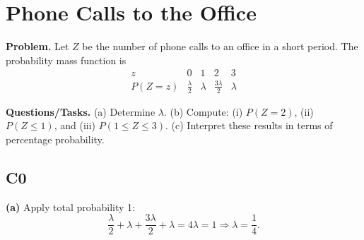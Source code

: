 		\section{Phone Calls to the Office}
		
		\textbf{Problem.}
		Let $Z$ be the number of phone calls to an office in a short period. The probability mass function is
		\[
		\begin{array}{c|cccc}
			z & 0 & 1 & 2 & 3\\
			\hline
			P(Z=z) & \frac{\lambda}{2} & \lambda & \frac{3\lambda}{2} & \lambda
		\end{array}
		\]
		
		\textbf{Questions/Tasks.}
		(a) Determine $\lambda$.
		(b) Compute: (i) $P(Z=2)$, (ii) $P(Z\le 1)$, and (iii) $P(1\le Z\le 3)$.
		(c) Interpret these results in terms of percentage probability.
		
		\subsection*{C0}

		\textbf{(a)} Apply total probability 1:
		\[
		\frac{\lambda}{2}+\lambda+\frac{3\lambda}{2}+\lambda=4\lambda=1\Rightarrow \lambda=\frac{1}{4}.
		\]

